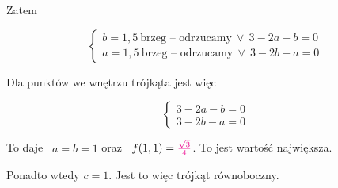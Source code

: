 \begin{przykladbig}
Zatem 

\[ \begin{cases} b = 1,5 \ \textrm{brzeg -- odrzucamy} \ \lor \ 3 - 2a - b = 0 \\
    a = 1,5 \ \textrm{brzeg -- odrzucamy} \ \lor \ 3 - 2b - a = 0
\end{cases} \]

Dla punktów we wnętrzu trójkąta jest więc

\[ 
\begin{cases}
    3 - 2a - b = 0 \\
    3 - 2b - a = 0
\end{cases}    
\]

To daje \ $ a = b = 1$ oraz \ $ f(1,1) = \textcolor{magenta}{\frac{\sqrt3}{4}} $. To jest wartość największa.

Ponadto wtedy $c = 1$. Jest to więc trójkąt równoboczny.
\end{przykladbig}